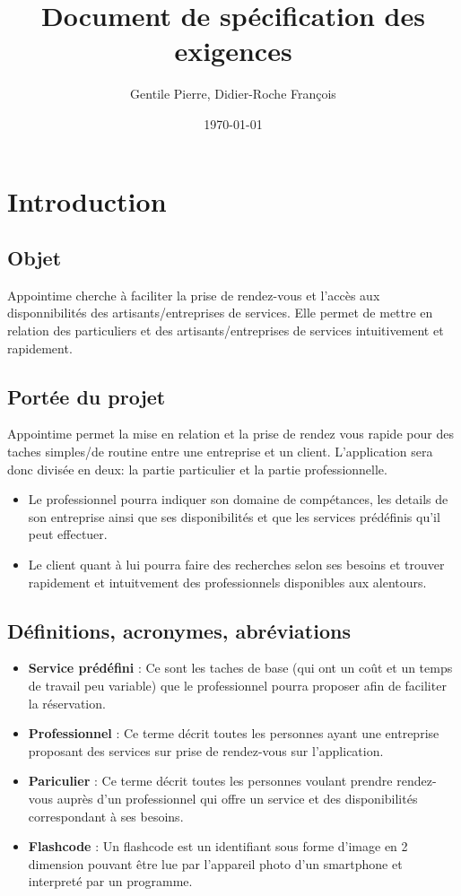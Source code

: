 \documentclass{article}
\author{Gentile Pierre, Didier-Roche François}
\date{\today}
\title{Document de spécification des exigences}
\begin{document}
\maketitle

\newpage
\tableofcontents
\newpage


\section{Introduction}
\subsection{Objet}
Appointime cherche à faciliter la prise de rendez-vous et l’accès aux disponnibilités des artisants/entreprises de services.
Elle permet de mettre en relation des particuliers et des artisants/entreprises de services intuitivement et rapidement.
\subsection{Portée du projet}
Appointime permet la mise en relation et la prise de rendez vous rapide pour des taches simples/de routine entre une entreprise et un client.
L’application sera donc divisée en deux: la partie particulier et la partie professionnelle.
\begin{itemize}
\item Le professionnel pourra indiquer son domaine de compétances, les details de son entreprise ainsi que ses disponibilités
 et que les services prédéfinis qu’il peut effectuer.
\item Le client quant à lui pourra faire des recherches selon ses
  besoins et trouver rapidement et intuitvement des professionnels
  disponibles aux alentours.
\end{itemize}
\subsection{Définitions, acronymes, abréviations}
\begin{itemize}

\item \textbf{Service prédéfini} : Ce sont les taches de base 
(qui ont un coût et un temps de travail peu variable) que le professionnel pourra proposer afin de faciliter la réservation.
\item \textbf{Professionnel} : Ce terme décrit toutes les personnes ayant une entreprise proposant des
  services sur prise de rendez-vous sur l'application.
\item \textbf{Pariculier} : Ce terme décrit toutes les personnes
  voulant prendre rendez-vous auprès d'un professionnel qui offre un service et des disponibilités correspondant à ses besoins.
\item \textbf{Flashcode} : Un flashcode est un identifiant sous forme
  d'image en 2 dimension pouvant être lue par l'appareil photo d'un smartphone et
  interpreté par un programme.

\end{itemize}
\end{document}
